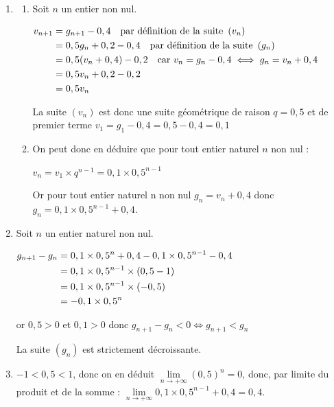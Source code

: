\begin{enumerate}
\begin{enumerate}
$\aligned g_{n+1}=P(G_{n+1}) &= P(G_n\cap G_{n+1}) + P(D_n \cap G_{n+1})\\
&= g_n\times 0,7 +(1-g_n)\times 0,2 \\
&= 0,7g_n+0,2- 0,2g_n\\
&= 0,5g_n+0,2\endaligned$

On arrive bien au résultat annoncé.

	\end{enumerate}
	\item
	\begin{enumerate}
		\item  Soit $n$ un entier non nul.

		$\aligned v_{n+1}& = g_{n+1}-0,4 \quad \text{par définition de la suite } \left(v_n\right)\\
		&= 0,5g_n+0,2-0,4 \quad \text{par définition de la suite } \left(g_n\right)\\
		&= 0,5 ( v_n+0,4) -0,2 \quad \text{car } v_n=g_n-0,4 \iff g_n=v_n+0,4\\
		&= 0,5 v_n +0,2-0,2\\
		&=0,5v_n\endaligned$

		La suite $ \left(v_n\right)$ est donc une suite géométrique de raison $q = 0,5$ et de premier terme \linebreak$v_1 = g_1 - 0,4 = 0,5 - 0,4 = 0,1$


		\item  On peut donc en déduire que pour tout entier naturel $n$ non nul :

		$v_n=v_1\times q^{n-1}= 0,1 \times 0,5^{n-1}$

		Or pour tout entier naturel n non nul \quad $g_n=v_n+0,4$ \quad donc \quad $g_n=0,1 \times 0,5^{n-1}+0,4$.

	\end{enumerate}
	\item   Soit $n$ un entier naturel non nul.

	$\aligned g_{n+1}-g_{n}&=0,1 \times 0,5^{n}+0,4-0,1 \times 0,5^{n-1}-0,4\\
	&= 0,1 \times 0,5^{n-1} \times ( 0,5-1)\\
	&= 0,1 \times 0,5^{n-1} \times (-0,5)\\
	&= -0,1 \times 0,5^n\endaligned$

	or $0,5 > 0$ et $0,1> 0$ donc $g_{n+1}- g_{n}< 0 \iff g_{n+1} <  g_{n}$

	La suite $\left(g_n\right)$ est strictement décroissante.


	\item   $-1 < 0,5<1$, donc on en déduit $\lim\limits_{n \to +\infty} \left(0,5\right)^n = 0$, donc, par limite du produit et de la somme : $\lim\limits_{n \to +\infty} 0,1 \times 0,5^{n-1}+0,4 = 0,4$.


\end{enumerate}
